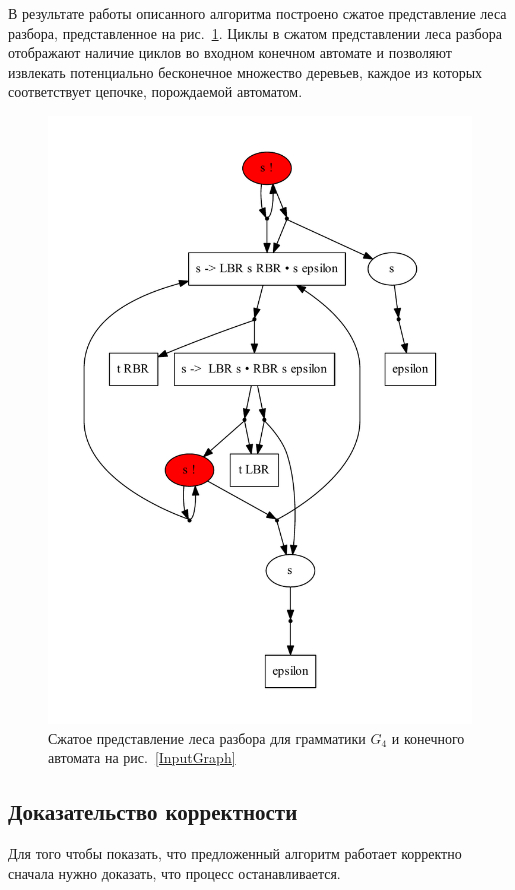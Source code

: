 В результате работы описанного алгоритма построено сжатое представление леса разбора, представленное на рис.~\ref{ExSppf}. Циклы в сжатом представлении леса разбора отображают наличие циклов во входном конечном автомате и позволяют извлекать потенциально бесконечное множество деревьев, каждое из которых соответствует цепочке, порождаемой автоматом.

\begin{figure}
 \centering
 \includegraphics[width=\textwidth]{Ragozina/pics/SppfExample.pdf}
 \caption{Сжатое представление леса разбора для грамматики $G_4$ и конечного автомата на рис.~\ref{InputGraph} }
 \label{ExSppf}
\end{figure}

\subsection{Доказательство корректности}
Для того чтобы показать, что предложенный алгоритм работает корректно сначала нужно доказать, что процесс останавливается.

